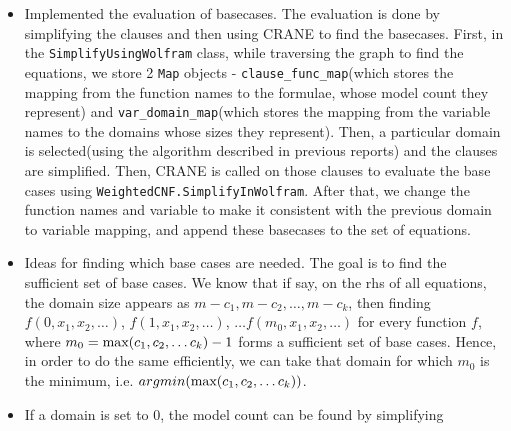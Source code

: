 \documentclass{article}
\begin{document}
\begin{itemize}
\begin{enumerate}
\begin{enumerate}
\begin{itemize}
                          \item \texttt{Sum[exp, x, a, b]} = ($\sum_{x=a}^{b}exp$) is converted to -\\
                                \begin{lstlisting}
([y,z,...](){
    int sum{0};
    for(int x{a}; x <= b; x++)
        sum += exp;
    return sum;
})()
\end{lstlisting}
                                where y, z, ... are the free variables present
                                in \texttt{exp}.
                        \end{itemize}
                \end{enumerate}
        \end{enumerate}
  \item Implemented the evaluation of basecases. The evaluation is done by
        simplifying the clauses and then using CRANE to find the basecases.
        First, in the \texttt{SimplifyUsingWolfram} class, while traversing the
        graph to find the equations, we store 2 \texttt{Map} objects -
        \texttt{clause\_func\_map}(which stores the mapping from the function
        names to the formulae, whose model count they represent) and
        \texttt{var\_domain\_map}(which stores the mapping from the variable
        names to the domains whose sizes they represent). Then, a particular
        domain is selected(using the algorithm described in previous reports)
        and the clauses are simplified. Then, CRANE is called on those clauses
        to evaluate the base cases using \texttt{WeightedCNF.SimplifyInWolfram}.
        After that, we change the function names and variable to make it
        consistent with the previous domain to variable mapping, and append
        these basecases to the set of equations.
  \item Ideas for finding which base cases are needed. The goal is to find the
        sufficient set of base cases. We know that if say, on the rhs of all
        equations, the domain size appears as $m-c_1, m-c_2, \dots, m-c_k$, then
        finding $f(0, x_1, x_2, \dots)$, $f(1, x_1, x_2, \dots)$,
        $\dots f(m_0, x_1, x_2, \dots)$ for every function $f$, where
        $m_0 = \textnormal{max}(c_1, c_2, \dots c_k) - 1$ forms a sufficient set
        of base cases. Hence, in order to do the same efficiently, we can take
        that domain for which $m_0$ is the minimum, i.e.
        $argmin(\textnormal{max}(c_1, c_2, \dots c_k))$.
  \item If a domain is set to $0$, the model count can be found by simplifying

\end{itemize}
\end{document}
